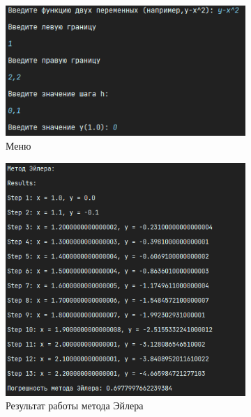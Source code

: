 \documentclass[12pt]{article}
\begin{document}
    \begin{figure}[ht]
        \centering
        \begin{subfigure}{0.4\textwidth}
            \includegraphics[width=\linewidth]{image/menu_Koshi}
            \caption{Меню}
        \end{subfigure}
        \begin{subfigure}{0.4\textwidth}
            \includegraphics[width=\linewidth]{image/euler_method}
            \caption{Результат работы метода Эйлера}
        \end{subfigure}
        \hfill
        \begin{subfigure}{0.4\textwidth}

\end{subfigure}
\end{figure}
\end{document}
